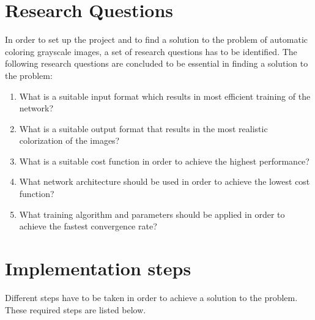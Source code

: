 \section{Research Questions}

In order to set up the project and to find a solution to the problem of automatic coloring grayscale images, a set of research questions has to be identified. The following research questions are concluded to be essential in finding a solution to the problem:

\begin{enumerate}
	\item {What is a suitable input format which results in most efficient training of the network?}
	\item {What is a suitable output format that results in the most realistic colorization of the images?}
	\item {What is a suitable cost function in order to achieve the highest performance?}
	\item {What network architecture should be used in order to achieve the lowest cost function?}
	\item {What training algorithm and parameters should be applied in order to achieve the fastest convergence rate?}
\end{enumerate}

\section{Implementation steps}
	
Different steps have to be taken in order to achieve a solution to the problem. These required steps are listed below.

